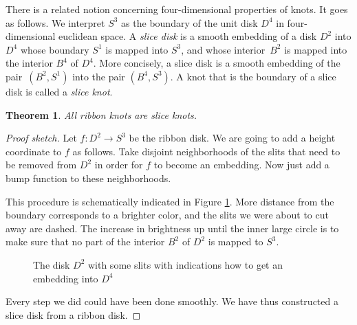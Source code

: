 \documentclass{article}
\newtheorem{theorem}{Theorem}[section]
\theoremstyle{definition}
\begin{document}
There is a related notion concerning four-dimensional properties of knots. It goes as follows. We interpret $S^3$ as the boundary of the unit disk $D^4$ in four-dimensional euclidean space. A \textit{slice disk} is a smooth embedding of a disk $D^2$ into $D^4$ whose boundary $S^1$ is mapped into $S^3$, and whose interior~$B^2$ is mapped into the interior $B^4$ of $D^4$. More concisely, a slice disk is a smooth embedding of the pair~$(B^2, S^1)$ into the pair $(B^4, S^3)$. A knot that is the boundary of a slice disk is called a \textit{slice knot}.

\begin{theorem}\label{thm:ribbon-are-slice}
All ribbon knots are slice knots.
\end{theorem}

\begin{proof}[Proof sketch]
Let $f: D^2 \rightarrow S^3$ be the ribbon disk. We are going to add a height coordinate to $f$ as follows. Take disjoint neighborhoods of the slits that need to be removed from $D^2$ in order for $f$ to become an embedding. Now just add a bump function to these neighborhoods.

This procedure is schematically indicated in Figure \ref{fig:ribbon-knots-are-slice}. More distance from the boundary corresponds to a brighter color, and the slits we were about to cut away are dashed. The increase in brightness up until the inner large circle is to make sure that no part of the interior $B^2$ of $D^2$ is mapped to $S^3$.

\begin{figure}[htb]
\centering
{}
\caption{The disk $D^2$ with some slits with indications how to get an embedding into $D^4$}
\label{fig:ribbon-knots-are-slice}
\end{figure}

Every step we did could have been done smoothly. We have thus constructed a slice disk from a ribbon disk.
\end{proof}
\end{document}
